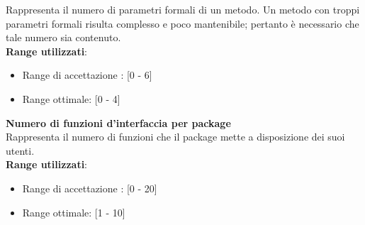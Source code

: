 Rappresenta il numero di parametri formali di un metodo. Un metodo con troppi parametri formali risulta complesso e poco mantenibile; pertanto è necessario che tale numero sia contenuto. \\

\textbf{Range utilizzati}:
\begin{itemize}
	\item Range di accettazione : [0 - 6]
	\item Range ottimale: [0 - 4]
\end{itemize}

\textbf{Numero di funzioni d'interfaccia per package}\\

Rappresenta il numero di funzioni che il package mette a disposizione dei suoi utenti. \\

\textbf{Range utilizzati}:
\begin{itemize}
	\item Range di accettazione : [0 - 20]
	\item Range ottimale: [1 - 10]
\end{itemize}
